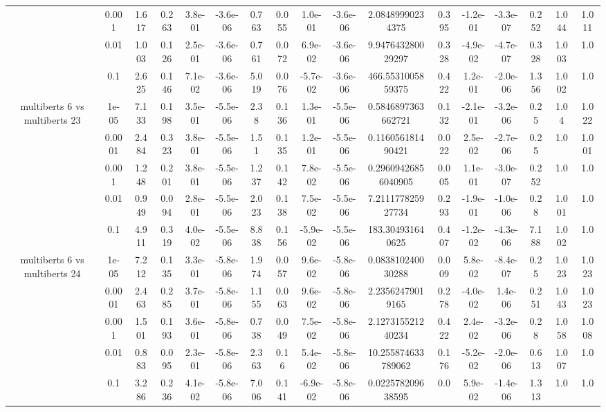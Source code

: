 \begin{tabular}{|c|c|c|c|c|c|c|c|c|c|c|c|c|c|c|c|c|}
 & 0.001 & 1.617 & 0.263 & 3.8e-01 & -3.6e-06 & 0.763 & 0.055 & 1.0e-01 & -3.6e-06 & 2.08489990234375 & 0.395 & -1.2e-01 & -3.3e-07 & 0.252 & 1.044 & 1.011 \\
 & 0.01 & 1.003 & 0.126 & 2.5e-01 & -3.6e-06 & 0.761 & 0.072 & 6.9e-02 & -3.6e-06 & 9.947643280029297 & 0.328 & -4.9e-02 & -4.7e-07 & 0.328 & 1.003 & 1.0 \\
 & 0.1 & 2.625 & 0.146 & 7.1e-02 & -3.6e-06 & 5.019 & 0.076 & -5.7e-02 & -3.6e-06 & 466.5531005859375 & 0.422 & 1.2e-01 & -2.0e-06 & 1.356 & 1.002 & 1.0 \\
\hline
\multirow{5}{*}{multiberts 6 vs multiberts 23} & 1e-05 & 7.133 & 0.198 & 3.5e-01 & -5.5e-06 & 2.38 & 0.136 & 1.3e-01 & -5.5e-06 & 0.5846897363662721 & 0.132 & -2.1e-01 & -3.2e-06 & 0.25 & 1.04 & 1.022 \\
 & 0.0001 & 2.484 & 0.323 & 3.8e-01 & -5.5e-06 & 1.51 & 0.135 & 1.2e-01 & -5.5e-06 & 0.116056181490421 & 0.022 & 2.5e-02 & -2.7e-06 & 0.25 & 1.0 & 1.001 \\
 & 0.001 & 1.248 & 0.201 & 3.8e-01 & -5.5e-06 & 1.237 & 0.142 & 7.8e-02 & -5.5e-06 & 0.29609426856040905 & 0.005 & 1.1e-01 & -3.0e-07 & 0.252 & 1.0 & 1.0 \\
 & 0.01 & 0.949 & 0.094 & 2.8e-01 & -5.5e-06 & 2.023 & 0.138 & 7.5e-02 & -5.5e-06 & 7.211177825927734 & 0.293 & -1.9e-01 & -1.0e-06 & 0.28 & 1.001 & 1.0 \\
 & 0.1 & 4.911 & 0.319 & 4.0e-02 & -5.5e-06 & 8.838 & 0.156 & -5.9e-02 & -5.5e-06 & 183.304931640625 & 0.407 & -1.2e-02 & -4.3e-06 & 7.188 & 1.002 & 1.0 \\
\hline
\multirow{5}{*}{multiberts 6 vs multiberts 24} & 1e-05 & 7.212 & 0.135 & 3.3e-01 & -5.8e-06 & 1.974 & 0.057 & 9.6e-02 & -5.8e-06 & 0.083810240030288 & 0.009 & 5.8e-02 & -8.4e-07 & 0.25 & 1.023 & 1.023 \\
 & 0.0001 & 2.463 & 0.285 & 3.7e-01 & -5.8e-06 & 1.155 & 0.063 & 9.6e-02 & -5.8e-06 & 2.23562479019165 & 0.278 & -4.0e-02 & 1.4e-06 & 0.251 & 1.043 & 1.023 \\
 & 0.001 & 1.501 & 0.193 & 3.6e-01 & -5.8e-06 & 0.738 & 0.049 & 7.5e-02 & -5.8e-06 & 2.127315521240234 & 0.422 & 2.4e-02 & -3.2e-06 & 0.28 & 1.058 & 1.008 \\
 & 0.01 & 0.883 & 0.095 & 2.3e-01 & -5.8e-06 & 2.363 & 0.16 & 5.4e-02 & -5.8e-06 & 10.255874633789062 & 0.176 & -5.2e-02 & -2.0e-06 & 0.613 & 1.007 & 1.0 \\
 & 0.1 & 3.286 & 0.236 & 4.1e-02 & -5.8e-06 & 7.006 & 0.141 & -6.9e-02 & -5.8e-06 & 0.022578209638595 & 0.0 & 5.9e-02 & -1.4e-06 & 1.313 & 1.0 & 1.0 \\

\end{tabular}
